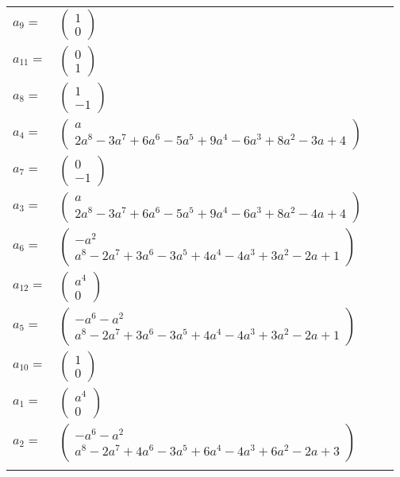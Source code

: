 \documentclass[1p]{elsarticle_modified}
\theoremstyle{definition}
\begin{document}
\begin{tabular}{m{7pt} m{180pt} m{7pt} m{180pt} }
\flushright $a_{9}=$&$\begin{pmatrix}1\\0\end{pmatrix}$ \\
\flushright $a_{11}=$&$\begin{pmatrix}0\\1\end{pmatrix}$ \\
\flushright $a_{8}=$&$\begin{pmatrix}1\\-1\end{pmatrix}$ \\
\flushright $a_{4}=$&$\begin{pmatrix}a\\2 a^8-3 a^7+6 a^6-5 a^5+9 a^4-6 a^3+8 a^2-3 a+4\end{pmatrix}$ \\
\flushright $a_{7}=$&$\begin{pmatrix}0\\-1\end{pmatrix}$ \\
\flushright $a_{3}=$&$\begin{pmatrix}a\\2 a^8-3 a^7+6 a^6-5 a^5+9 a^4-6 a^3+8 a^2-4 a+4\end{pmatrix}$ \\
\flushright $a_{6}=$&$\begin{pmatrix}- a^2\\a^8-2 a^7+3 a^6-3 a^5+4 a^4-4 a^3+3 a^2-2 a+1\end{pmatrix}$ \\
\flushright $a_{12}=$&$\begin{pmatrix}a^4\\0\end{pmatrix}$ \\
\flushright $a_{5}=$&$\begin{pmatrix}- a^6- a^2\\a^8-2 a^7+3 a^6-3 a^5+4 a^4-4 a^3+3 a^2-2 a+1\end{pmatrix}$ \\
\flushright $a_{10}=$&$\begin{pmatrix}1\\0\end{pmatrix}$ \\
\flushright $a_{1}=$&$\begin{pmatrix}a^4\\0\end{pmatrix}$ \\
\flushright $a_{2}=$&$\begin{pmatrix}- a^6- a^2\\a^8-2 a^7+4 a^6-3 a^5+6 a^4-4 a^3+6 a^2-2 a+3\end{pmatrix}$\\&\end{tabular}
\end{document}
